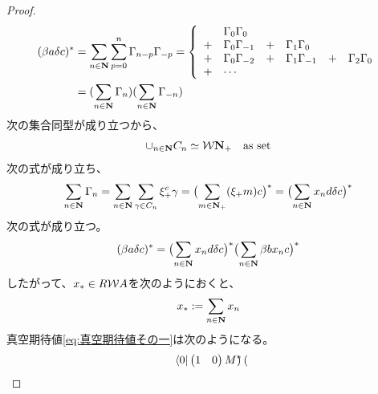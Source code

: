 {\begin{proof}
		\begin{equation*}\begin{split}
			(\beta a\delta c)^* 
			&= \sum_{n\in\mathbf{N}} \sum_{p=0}^n \Gamma_{n-p}\Gamma_{-p}
			= \left\{\begin{array}{clclclcl}
				& \Gamma_0\Gamma_0 \\
				+ & \Gamma_0\Gamma_{-1} &+& \Gamma_1\Gamma_0 \\
				+ & \Gamma_0\Gamma_{-2} &+& \Gamma_1\Gamma_{-1} &+& \Gamma_2\Gamma_{0} \\
				+ & \cdots
			\end{array}\right. \\
			&= (\sum_{n\in\mathbf{N}}\Gamma_n)(\sum_{n\in\mathbf{N}}\Gamma_{-n}) \\
		\end{split}\end{equation*}
		次の集合同型が成り立つから、
		\begin{equation*}\begin{split}
			\cup_{n\in\mathbf{N}}C_n \simeq {\ensuremath{{\mathcal{W}}}}\mathbf{N}_+ \quad\text{as set}
		\end{split}\end{equation*}
		次の式が成り立ち、
		\begin{equation*}\begin{split}
			\sum_{n\in\mathbf{N}}\Gamma_n
			= \sum_{n\in\mathbf{N}}\sum_{\gamma\in C_n} \xi_+^c\gamma
			= \bigl(\sum_{m\in\mathbf{N}_+}(\xi_+m)c\bigr)^*
			= \bigl(\sum_{n\in\mathbf{N}}x_nd\delta c\bigr)^*
		\end{split}\end{equation*}
		次の式が成り立つ。
		\begin{equation*}\begin{split}
			(\beta a\delta c)^* = \bigl(\sum_{n\in\mathbf{N}}x_nd\delta c\bigr)^*
				\bigl(\sum_{n\in\mathbf{N}}\beta bx_nc\bigr)^*
		\end{split}\end{equation*}
		したがって、$x_*\in R{{\mathcal{W}}} A$を次のようにおくと、
		\begin{equation*}\begin{split}
			x_* := \sum_{n\in\mathbf{N}} x_n
		\end{split}\end{equation*}
		真空期待値\eqref{eq:真空期待値その一}は次のようになる。
		\begin{equation*}\begin{split}
			\mathinner{\langle{0}|}\begin{pmatrix}
				1 & 0
			\end{pmatrix}M^*\begin{pmatrix}

\end{pmatrix}
\end{split}
\end{equation*}
\end{proof}}
